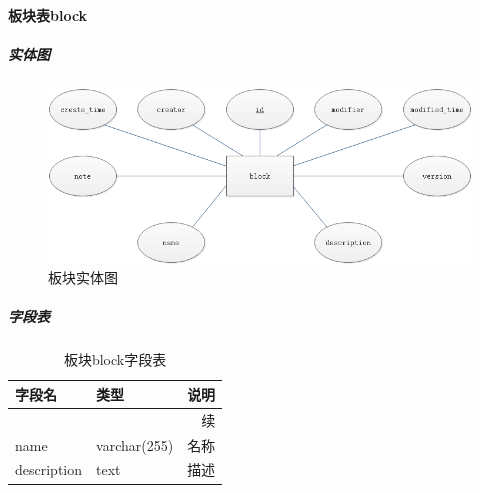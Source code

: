 \documentclass[titlepage,UTF8,linespread=1.5]{ctexart}
\begin{document}
\paragraph{板块表block}
\subparagraph{实体图}
\begin{figure}[H]
    \centering
    \includegraphics[width=140mm]{entity-block.png}
    \caption{板块实体图}
    \label{fig:entity-block}
\end{figure}
\subparagraph{字段表}
\begin{longtable}{|p{10em}|p{6em}|p{15em}|}
    \caption{板块block字段表}\label{tab:table_block}     \\\hline
    字段名         & 类型         & 说明                 \\\hline
    \endfirsthead
    \multicolumn{3}{r}{{续\tablename\thetable{}}}        \\\hline
    \endhead
    name           & varchar(255) & 名称                 \\\hline
    description    & text         & 描述                 \\\hline
\end{longtable}\par
\end{document}
